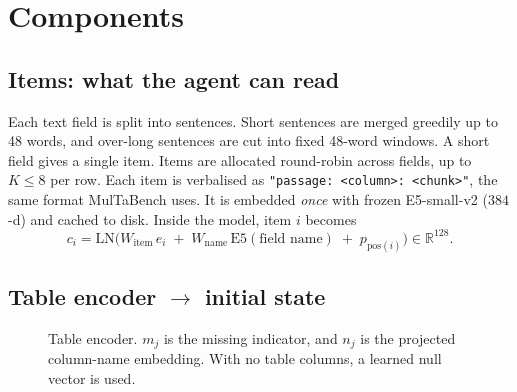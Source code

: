 \documentclass[11pt,a4paper]{article}
\newcommand{\htab}{h_{\mathrm{tab}}}
\begin{document}
\section{Components}

\subsection{Items: what the agent can read}
Each text field is split into sentences.
Short sentences are merged greedily up to 48 words, and over-long sentences are cut into fixed 48-word windows.
A short field gives a single item.
Items are allocated round-robin across fields, up to $K\le 8$ per row.
Each item is verbalised as \texttt{"passage: <column>: <chunk>"}, the same format MulTaBench uses.
It is embedded \emph{once} with frozen E5-small-v2 ($384$-d) and cached to disk.
Inside the model, item $i$ becomes
\[
  c_i=\mathrm{LN}\big(W_{\mathrm{item}}\,e_i \;+\; W_{\mathrm{name}}\,\mathrm{E5}(\text{field name}) \;+\; p_{\mathrm{pos}(i)}\big)\in\mathbb{R}^{128}.
\]

\subsection{Table encoder $\to$ initial state}
\begin{figure}[h]
\centering
{}
\caption{Table encoder. $m_j$ is the missing indicator, and $n_j$ is the projected column-name embedding.
With no table columns, a learned null vector is used.}
\end{figure}
\end{document}
